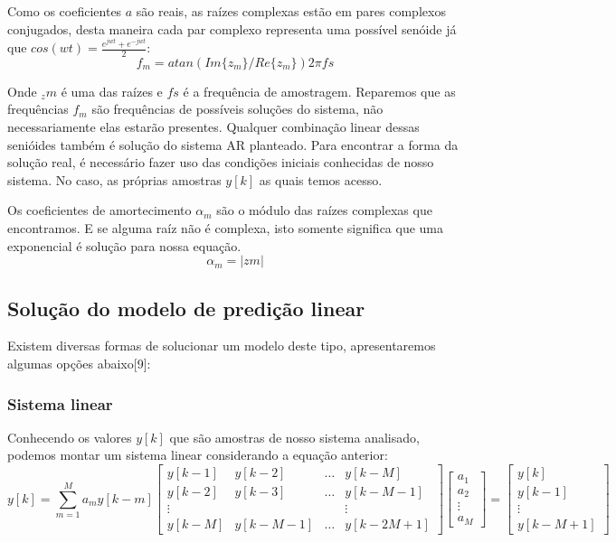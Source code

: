 \documentclass[a4paper, 12pt]{book}
\begin{document}
\indent Como os coeficientes $a$  são reais, as raízes complexas estão em pares complexos conjugados, desta maneira cada par complexo representa uma possível senóide já que $cos(wt)=\frac{e^{jwt}+e^{-jwt}}{2}$:
\begin{equation}
f_m=atan(Im\{z_m\}/Re\{z_m\})2\pi fs
\end{equation}

\indent Onde $_zm$ é uma das raízes e $fs$ é a frequência de amostragem.
\indent Reparemos que as frequências $f_m$ são frequências de possíveis soluções do sistema, não necessariamente elas estarão presentes. Qualquer combinação linear dessas senióides também é solução do sistema AR planteado. Para encontrar a forma da solução real, é  necessário fazer uso das condições iniciais conhecidas de nosso sistema. No caso, as próprias amostras $y[k]$ as quais temos acesso.

\indent Os coeficientes de amortecimento $\alpha_m$ são o módulo das raízes complexas que encontramos. E se alguma raíz não é complexa, isto somente significa que uma exponencial é solução para nossa equação.
\begin{equation}
\alpha_m=|zm|
\end{equation}
\subsection{Solução do modelo de predição linear}

Existem diversas formas de solucionar um modelo deste tipo, apresentaremos algumas opções abaixo[9]:

\subsubsection{Sistema linear}

Conhecendo os valores $y[k]$ que são amostras de nosso sistema analisado, podemos montar um sistema linear considerando a equação anterior:
\begin{equation}
y[k]=\sum_{m=1}^{M}a_m y[k-m]
\begin{bmatrix}
y[k-1] & y[k-2] & \dots & y[k-M] \\
y[k-2] & y[k-3] & \dots & y[k-M-1] \\
\vdots & & & \vdots\\
y[k-M] & y[k-M-1] & \dots & y[k-2M+1]
\end{bmatrix}
\begin{bmatrix}
a_1 \\ a_2 \\ \vdots \\ a_M
\end{bmatrix}
=
\begin{bmatrix}
y[k] \\ y[k-1] \\ \vdots \\ y[k-M+1]
\end{bmatrix}
\end{equation}
\end{document}
